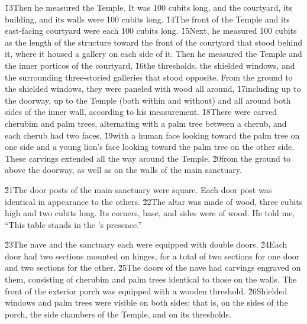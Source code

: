 \v{13}Then he measured the Temple. It was 100 cubits long, and the courtyard, its building, and its walls were 100 cubits long. \v{14}The front of the Temple and its east-facing courtyard were each 100 cubits long. \v{15}Next, he measured 100 cubits as the length of the structure toward the front of the courtyard that stood behind it, where it housed a gallery on each side of it. Then he measured the Temple and the inner porticos of the courtyard, \v{16}the thresholds, the shielded windows, and the surrounding three-storied galleries that stood opposite. From the ground to the shielded windows, they were paneled with wood all around, \v{17}including up to the doorway, up to the Temple (both within and without) and all around both sides of the inner wall, according to his measurement. \v{18}There were carved cherubim and palm trees, alternating with a palm tree between a cherub, and each cherub had two faces, \v{19}with a human face looking toward the palm tree on one side and a young lion's face looking toward the palm tree on the other side. These carvings extended all the way around the Temple, \v{20}from the ground to above the doorway, as well as on the walls of the main sanctuary.

\v{21}The door posts of the main sanctuary were square. Each door post was identical in appearance to the others. \v{22}The altar was made of wood, three cubits high and two cubits long. Its corners, base, and sides were of wood. He told me, ``This table stands in the 's presence.''

\v{23}The nave and the sanctuary each were equipped with double doors. \v{24}Each door had two sections mounted on hinges, for a total of two sections for one door and two sections for the other. \v{25}The doors of the nave had carvings engraved on them, consisting of cherubim and palm trees identical to those on the walls. The front of the exterior porch was equipped with a wooden threshold. \v{26}Shielded windows and palm trees were visible on both sides; that is, on the sides of the porch, the side chambers of the Temple, and on its thresholds.


